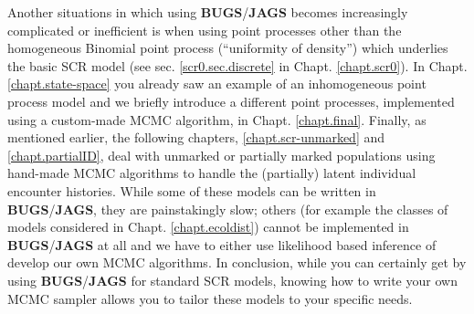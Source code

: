 Another situations in which using {\bf BUGS}/{\bf JAGS} becomes
increasingly
complicated or inefficient is when using point processes other
than the homogeneous Binomial point process (``uniformity of density'') which underlies the basic
 SCR model (see sec. \ref{scr0.sec.discrete} in Chapt. \ref {chapt.scr0}). In Chapt.
 \ref {chapt.state-space} you already saw an example of an inhomogeneous point process model  and we briefly introduce a different point processes,
  implemented using a custom-made MCMC algorithm, in Chapt. \ref{chapt.final}. 
Finally, as mentioned earlier, the following chapters, \ref {chapt.scr-unmarked} and \ref {chapt.partialID}, deal with unmarked or
partially marked populations using hand-made MCMC algorithms to
handle the (partially) latent individual encounter histories.
While some of these models can be written in {\bf BUGS}/{\bf JAGS}, they are painstakingly slow; others (for example the classes of models
 considered in Chapt. \ref{chapt.ecoldist}) cannot be implemented in
 {\bf BUGS}/{\bf JAGS} at all and we have to either use likelihood based inference of develop our own MCMC algorithms.
In conclusion, while you can certainly get by using {\bf BUGS}/{\bf JAGS}
for standard SCR models, knowing how to write your own MCMC sampler
allows you to tailor these models to your specific needs.


